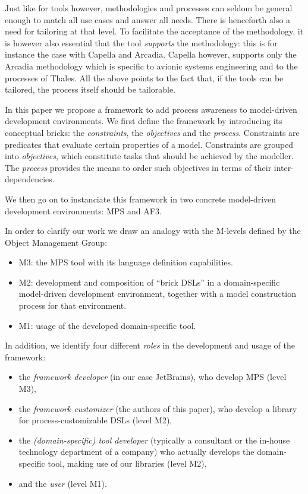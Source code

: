 Just like for tools however, methodologies and processes can seldom be general enough to match 
all use cases and answer all needs. There is henceforth also a need for tailoring at
that level. To facilitate the acceptance of the methodology, it is however also essential
that the tool \emph{supports} the methodology: this is for instance the case
with Capella and Arcadia.
Capella however, supports only the Arcadia methodology which
is specific to avionic systems engineering and to the processes of Thales.
All the above points to the fact that, if the tools can be tailored, the process
itself should be tailorable.

In this paper we propose a framework to add process awareness to model-driven
development environments. We first define the framework by introducing its
conceptual bricks: the \emph{constraints}, the \emph{objectives} and the
\emph{process}. Constraints are predicates that evaluate certain properties of a
model. Constraints are grouped into \emph{objectives}, which constitute tasks
that should be achieved by the modeller. The \emph{process} provides the means
to order such objectives in terms of their inter-dependencies.

We then go on to instanciate this framework in two concrete model-driven
development environments: MPS and AF3.

In order to clarify our work we draw an analogy with the M-levels defined by the Object Management Group:
\begin{itemize}
  \item M3: the MPS tool with its language definition capabilities.
  \item M2: development and composition of ``brick DSLs'' in a
  domain-specific model-driven development environment, together with a
  model construction process for that environment.
  \item M1: usage of the developed domain-specific tool.
\end{itemize}
In addition, we identify four different \emph{roles} in the development and
usage of the framework:
\begin{itemize}
  \item the \emph{framework developer} (in our case JetBrains), who develop MPS
  (level M3),
  \item the \emph{framework customizer} (the authors of this paper), who develop
  a library for process-customizable DSLs (level M2),
  \item the \emph{(domain-specific) tool developer} 
    (typically a consultant or the in-house technology department of a company)
    who actually develops the domain-specific tool, making use of our libraries (level M2),
  \item and the \emph{user} (level M1).
\end{itemize}

